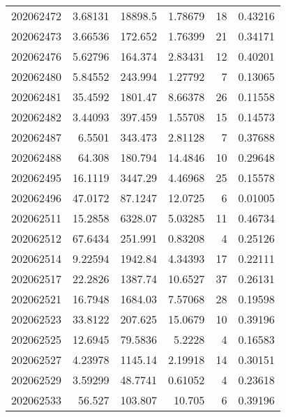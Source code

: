 \begin{tabular}{rrrrrr}
 202062472 &          3.68131 &    18898.5    &            1.78679 &          18 & 0.43216 \\
 202062473 &          3.66536 &      172.652  &            1.76399 &          21 & 0.34171 \\
 202062476 &          5.62796 &      164.374  &            2.83431 &          12 & 0.40201 \\
 202062480 &          5.84552 &      243.994  &            1.27792 &           7 & 0.13065 \\
 202062481 &         35.4592  &     1801.47   &            8.66378 &          26 & 0.11558 \\
 202062482 &          3.44093 &      397.459  &            1.55708 &          15 & 0.14573 \\
 202062487 &          6.5501  &      343.473  &            2.81128 &           7 & 0.37688 \\
 202062488 &         64.308   &      180.794  &           14.4846  &          10 & 0.29648 \\
 202062495 &         16.1119  &     3447.29   &            4.46968 &          25 & 0.15578 \\
 202062496 &         47.0172  &       87.1247 &           12.0725  &           6 & 0.01005 \\
 202062511 &         15.2858  &     6328.07   &            5.03285 &          11 & 0.46734 \\
 202062512 &         67.6434  &      251.991  &            0.83208 &           4 & 0.25126 \\
 202062514 &          9.22594 &     1942.84   &            4.34393 &          17 & 0.22111 \\
 202062517 &         22.2826  &     1387.74   &           10.6527  &          37 & 0.26131 \\
 202062521 &         16.7948  &     1684.03   &            7.57068 &          28 & 0.19598 \\
 202062523 &         33.8122  &      207.625  &           15.0679  &          10 & 0.39196 \\
 202062525 &         12.6945  &       79.5836 &            5.2228  &           4 & 0.16583 \\
 202062527 &          4.23978 &     1145.14   &            2.19918 &          14 & 0.30151 \\
 202062529 &          3.59299 &       48.7741 &            0.61052 &           4 & 0.23618 \\
 202062533 &         56.527   &      103.807  &           10.705   &           6 & 0.39196 \\

\end{tabular}

